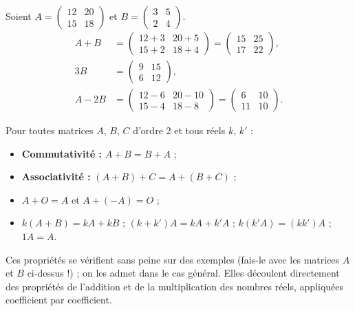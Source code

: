 \documentclass[11pt]{article}
\begin{document}
\begin{exemplebox}
Soient $A = \begin{pmatrix} 12 & 20 \\ 15 & 18 \end{pmatrix}$ et $B = \begin{pmatrix} 3 & 5 \\ 2 & 4 \end{pmatrix}$.
\begin{align*}
A + B &= \begin{pmatrix} 12+3 & 20+5 \\ 15+2 & 18+4 \end{pmatrix} = \begin{pmatrix} 15 & 25 \\ 17 & 22 \end{pmatrix}, \\
3B &= \begin{pmatrix} 9 & 15 \\ 6 & 12 \end{pmatrix}, \\
A - 2B &= \begin{pmatrix} 12-6 & 20-10 \\ 15-4 & 18-8 \end{pmatrix} = \begin{pmatrix} 6 & 10 \\ 11 & 10 \end{pmatrix}.
\end{align*}
\end{exemplebox}

\begin{propriete}
Pour toutes matrices $A$, $B$, $C$ d'ordre 2 et tous réels $k$, $k'$ :
\begin{itemize}
\item \textbf{Commutativité :} $A + B = B + A$ ;
\item \textbf{Associativité :} $(A + B) + C = A + (B + C)$ ;
\item $A + O = A$ et $A + (-A) = O$ ;
\item $k(A+B) = kA + kB$ ; \quad $(k+k')A = kA + k'A$ ; \quad $k(k'A) = (kk')A$ ; \quad $1A = A$.
\end{itemize}
Ces propriétés se vérifient sans peine sur des exemples (fais-le avec les matrices $A$ et $B$ ci-dessus !) ; on les admet dans le cas général. Elles découlent directement des propriétés de l'addition et de la multiplication des nombres réels, appliquées coefficient par coefficient.
\end{propriete}
\end{document}
